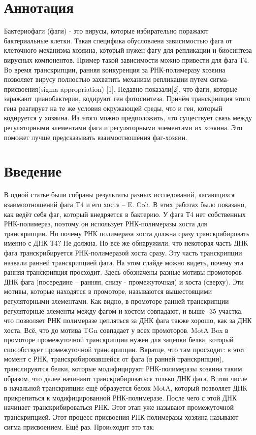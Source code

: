 \documentclass[a4paper,12pt]{article}
\begin{document}


\newpage
\section{Аннотация}

Бактериофаги (фаги) - это вирусы, которые избирательно поражают бактериальные клетки. Такая специфика обусловлена
зависимостью фага от клеточного механизма хозяина, который нужен фагу для репликации и биосинтеза вирусных компонентов.
Пример такой зависимости  можно привести для фага Т4. Во время транскрипции, ранняя конкуренция за РНК-полимеразу хозяина
позволяет вирусу полностью захватить механизм репликации путем сигма-присвоения(sigma appropriation) [1]. Недавно
показали[2], что фаги, которые заражают цианобактерии, кодируют ген фотосинтеза. Причём транскрипция этого гена реагирует
на те же условия окружающей среды, что и ген, который кодируется у хозяина. Из этого можно предположить, что существует
связь между регуляторными элементами фага и регуляторными элементами их хозяина. Это поможет лучше предсказывать
взаимоотношения фаг-хозяин.

\newpage
\tableofcontents



\newpage
\section{Введение}

    В одной статье были собраны результаты разных исследований, касающихся взаимоотношений фага T4 и его хоста – E. Coli.
    В этих работах было показано, как ведёт себя фаг, который внедряется в бактерию.
	У фага Т4 нет собственных РНК-полимераз, поэтому он использует РНК-полимеразы хоста для транскрипции. Но почему РНК
	полимераза хоста должна сразу транскрибировать именно с ДНК Т4? Не должна. Но всё же обнаружили, что некоторая часть
	ДНК фага транскрибируется РНК-полимеразой хоста сразу. Эту часть транскрипции назвали ранней транскрипцией фага. На
	этом слайде можно видеть, почему эта ранняя транскрипция просходит. Здесь обозначены разные мотивы промоторов ДНК
	фага (посередине – ранняя, снизу - промежуточная) и хоста (сверху). Эти мотивы, которые находятся в промоторе,
	называются вышестоящими регуляторными элементами. Как видно, в промоторе ранней транскрипции регуляторные элементы
	между фагом и хостом совпадают, и выше -35 участка, что позволяет РНК полимеразе цепляться за ДНК фага также хорошо,
	как за ДНК хоста.  Всё, что до мотива TGn совпадает у всех промоторов. MotA Box в промоторе промежуточной
	транскрипции нужен для зацепки белка, который способствует промежуточной транскрипции. Вкратце, что там просходит: в
	этот момент с РНК, транскрибировавшейся от фага (в ранней транскрипции), транслируются белки, которые модифицируют
	РНК-полимеразы хозяина таким образом, что далее начинают транскрибироваться только ДНК фага. В том числе в начальной
	транскрипции ещё образуется белок MotA, который позволяет ДНК прикрепиться к модифицированной РНК-полимеразе. После
	чего с этой ДНК начинает транскрибироваться РНК. Этот этап уже называют промежуточной транскрипцией. Этот процесс
	присвоения РНК-полимеразы хозяина называют сигма присвоением. Ещё раз. Проиcходит это так:
\end{document}
